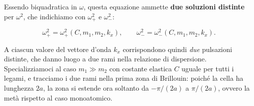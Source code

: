 Essendo biquadratica in \( \omega \), questa equazione ammette \textbf{due soluzioni distinte} per \( \omega^{2} \), che indichiamo con \( \omega_{+}^{2} \) e \( \omega_{-}^{2} \):

\begin{equation}
    \omega_{+}^{2} = \omega_{+}^{2}(C, m_1, m_2, k_x), \qquad \omega_{-}^{2} = \omega_{-}^{2}(C, m_1, m_2, k_x).
\end{equation}

A ciascun valore del vettore d'onda \( k_x \) corrispondono quindi \emph{due} pulsazioni distinte, che danno luogo a due rami nella relazione di dispersione. Specializziamoci al caso \( m_1 \gg m_2 \) con costante elastica \( C \) uguale per tutti i legami, e tracciamo i due rami nella prima zona di Brillouin: poiché la cella ha lunghezza \( 2a \), la zona si estende ora soltanto da \( -\pi/(2a) \) a \( \pi/(2a) \), ovvero la metà rispetto al caso monoatomico.

